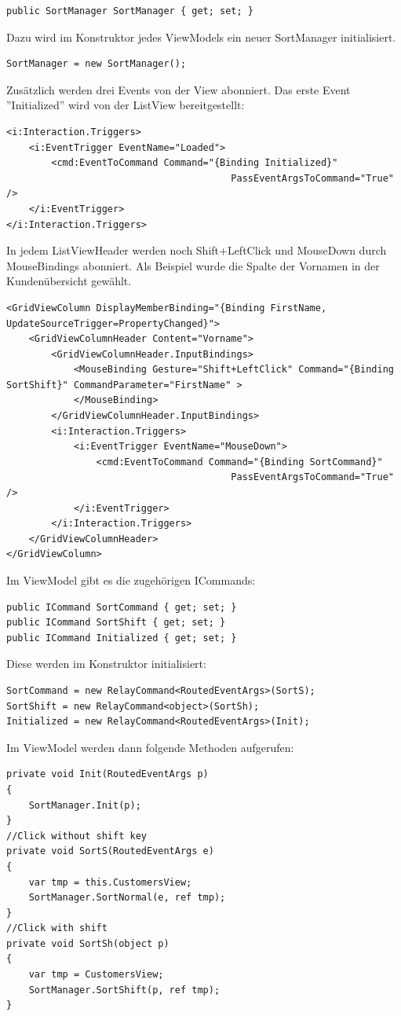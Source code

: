 \begin{lstlisting}
public SortManager SortManager { get; set; }
\end{lstlisting} 
Dazu wird im Konstruktor jedes ViewModels ein neuer SortManager initialisiert.
\begin{lstlisting}
SortManager = new SortManager();
\end{lstlisting}
Zusätzlich werden drei Events von der View abonniert. \newline Das erste Event ''Initialized'' wird von der ListView bereitgestellt:
\begin{lstlisting}
<i:Interaction.Triggers>
	<i:EventTrigger EventName="Loaded">
		<cmd:EventToCommand Command="{Binding Initialized}"
                                        PassEventArgsToCommand="True" />
	</i:EventTrigger>
</i:Interaction.Triggers>
\end{lstlisting}
In jedem ListViewHeader werden noch Shift+LeftClick und MouseDown durch MouseBindings abonniert. Als Beispiel wurde die Spalte der Vornamen in der Kundenübersicht gewählt.
\begin{lstlisting}
<GridViewColumn DisplayMemberBinding="{Binding FirstName, UpdateSourceTrigger=PropertyChanged}">
	<GridViewColumnHeader Content="Vorname">
		<GridViewColumnHeader.InputBindings>
			<MouseBinding Gesture="Shift+LeftClick" Command="{Binding SortShift}" CommandParameter="FirstName" >
			</MouseBinding>
		</GridViewColumnHeader.InputBindings>
		<i:Interaction.Triggers>
			<i:EventTrigger EventName="MouseDown">
				<cmd:EventToCommand Command="{Binding SortCommand}"
                                        PassEventArgsToCommand="True" />
			</i:EventTrigger>
		</i:Interaction.Triggers>
	</GridViewColumnHeader>
</GridViewColumn>
\end{lstlisting}
Im ViewModel gibt es die zugehörigen ICommands:
\begin{lstlisting}
public ICommand SortCommand { get; set; }
public ICommand SortShift { get; set; }
public ICommand Initialized { get; set; }
\end{lstlisting}
Diese werden im Konstruktor initialisiert:
\begin{lstlisting}
SortCommand = new RelayCommand<RoutedEventArgs>(SortS);
SortShift = new RelayCommand<object>(SortSh);
Initialized = new RelayCommand<RoutedEventArgs>(Init);
\end{lstlisting}
Im ViewModel werden dann folgende Methoden aufgerufen:
\begin{lstlisting}
private void Init(RoutedEventArgs p)
{
	SortManager.Init(p);
}
//Click without shift key
private void SortS(RoutedEventArgs e)
{
	var tmp = this.CustomersView;
	SortManager.SortNormal(e, ref tmp);
}
//Click with shift
private void SortSh(object p)
{
	var tmp = CustomersView;
	SortManager.SortShift(p, ref tmp);
}
\end{lstlisting}
